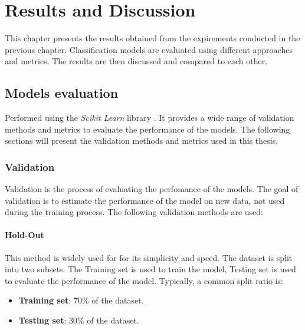 \hypersetup{colorlinks=true, linkcolor=blue, citecolor=red}

\chapter{Results and Discussion} \label{chap:results_and_discussion}

    This chapter presents the results obtained from the expirements conducted in the previous chapter. Classification models are evaluated using different approaches and metrics. The results are then discussed and compared to each other.

    \section{Models evaluation}

        Performed using the \textit{Scikit Learn} library \cite{sklearn_api}. It provides a wide range of validation methods and metrics to evaluate the performance of the models. The following sections will present the validation methods and metrics used in this thesis.

        \subsection{Validation}

            Validation is the process of evaluating the perfomance of the models. The goal of validation is to estimate the performance of the model on new data, not used during the training process. The following validation methods are used:

            \subsubsection{Hold-Out}

                This method is widely used for for its simplicity and speed. The dataset is split into two subsets. The Training set is used to train the model, Testing set is used to evaluate the performance of the model. Typically, a common split ratio is:
                \begin{itemize}
                    \item \textbf{Training set}: 70\% of the dataset.
                    \item \textbf{Testing set}: 30\% of the dataset.
                \end{itemize}
            
